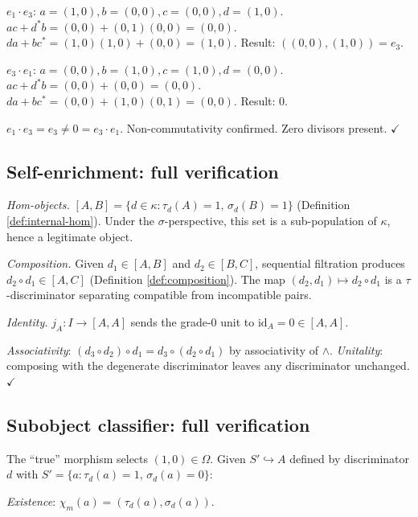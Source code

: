 $e_1 \cdot e_3$: $a=(1,0), b=(0,0), c=(0,0), d=(1,0)$.
$ac + d^*b = (0,0) + (0,1)(0,0) = (0,0)$.
$da + bc^* = (1,0)(1,0) + (0,0) = (1,0)$.
Result: $((0,0),(1,0)) = e_3$.

$e_3 \cdot e_1$: $a=(0,0), b=(1,0), c=(1,0), d=(0,0)$.
$ac + d^*b = (0,0) + (0,0) = (0,0)$.
$da + bc^* = (0,0) + (1,0)(0,1) = (0,0)$.
Result: $0$.

$e_1 \cdot e_3 = e_3 \neq 0 = e_3 \cdot e_1$.
Non-commutativity confirmed. Zero divisors present.
$\checkmark$

\subsection{Self-enrichment: full verification}
\label{app:self-enrichment-full}

\emph{Hom-objects.}
$[A,B] = \{d \in \kappa : \tau_d(A) = 1,\,\sigma_d(B) = 1\}$
(Definition \ref{def:internal-hom}). Under the
$\sigma$-perspective, this set is a sub-population of
$\kappa$, hence a legitimate object.

\emph{Composition.}
Given $d_1 \in [A,B]$ and $d_2 \in [B,C]$, sequential
filtration produces $d_2 \circ d_1 \in [A,C]$
(Definition \ref{def:composition}). The map
$(d_2, d_1) \mapsto d_2 \circ d_1$ is a $\tau$-discriminator
separating compatible from incompatible pairs.

\emph{Identity.}
$j_A: I \to [A,A]$ sends the grade-0 unit to
$\mathrm{id}_A = 0 \in [A,A]$.

\emph{Associativity}: $(d_3 \circ d_2) \circ d_1 =
d_3 \circ (d_2 \circ d_1)$ by associativity of $\wedge$.
\emph{Unitality}: composing with the degenerate
discriminator leaves any discriminator unchanged.
$\checkmark$

\subsection{Subobject classifier: full verification}
\label{app:subobj-full}

The ``true'' morphism selects $(1,0) \in \Omega$.
Given $S' \hookrightarrow A$ defined by discriminator $d$
with $S' = \{a : \tau_d(a) = 1,\, \sigma_d(a) = 0\}$:

\emph{Existence}: $\chi_m(a) = (\tau_d(a), \sigma_d(a))$.

